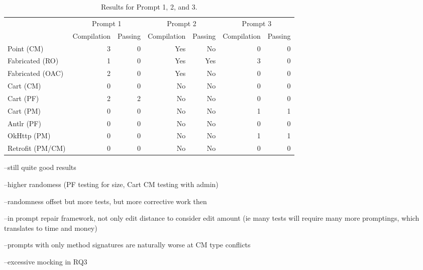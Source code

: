 \begin{table}[t]
    \centering
    \begin{tabular}{@{\extracolsep{\fill}} l*{6}{r}} \toprule
                      & \multicolumn{2}{c}{Prompt 1} & \multicolumn{2}{c}{Prompt 2} & \multicolumn{2}{c}{Prompt 3} \\
                      & Compilation & Passing & Compilation & Passing & Compilation & Passing \\
    \midrule
    Point (CM)       & 3 & 0 & Yes & No & 0 & 0 \\
    Fabricated (RO)  & 1 & 0 & Yes & Yes & 3 & 0 \\ 
    Fabricated (OAC) & 2 & 0 & Yes & No & 0 & 0 \\
    Cart (CM)        & 0 & 0 & No & No & 0 & 0 \\
    Cart (PF)        & 2 & 2 & No & No & 0 & 0 \\
    Cart (PM)        & 0 & 0 & No & No & 1 & 1 \\
    Antlr (PF)       & 0 & 0 & No & No & 0 & 0 \\
    OkHttp (PM)      & 0 & 0 & No & No & 1 & 1 \\
    Retrofit (PM/CM) & 0 & 0 & No & No & 0 & 0 \\
    \bottomrule
    \end{tabular}
    \caption{Results for Prompt 1, 2, and 3.\label{tab:results:rq3p1}}
\end{table}

--still quite good results 

--higher randomess (PF testing for size, Cart CM testing with admin)

--randomness offset but more tests, but more corrective work then

--in prompt repair framework, not only edit distance to consider edit amount
(ie many tests will require many more promptings, which translates to time and
money)

--prompts with only method signatures are naturally worse at CM type conflicts

--excessive mocking in RQ3